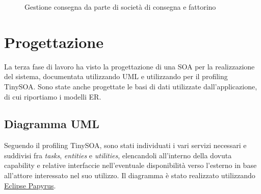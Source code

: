 \documentclass[11pt]{article} %
\begin{document}
\begin{figure}[p]
\begin{center}
\caption{Gestione consegna da parte di società di consegna e fattorino}
\end{center}
\end{figure}

\clearpage

\section{Progettazione}
\label{sez:progettazione}

La terza fase di lavoro ha visto la progettazione di una SOA per la realizzazione del sistema, documentata utilizzando UML e utilizzando per il profiling TinySOA. Sono state anche progettate le basi di dati utilizzate dall'applicazione, di cui riportiamo i modelli ER.

\subsection{Diagramma UML}

Seguendo il profiling TinySOA, sono stati individuati i vari servizi necessari e suddivisi fra \emph{tasks}, \emph{entities} e \emph{utilities}, elencandoli all'interno della dovuta capability e relative interfaccie nell'eventuale disponibilità verso l'esterno in base all'attore interessato nel suo utilizzo. Il diagramma è stato realizzato utilizzando \href{https://www.eclipse.org/papyrus/}{Eclipse Papyrus}.
\end{document}

